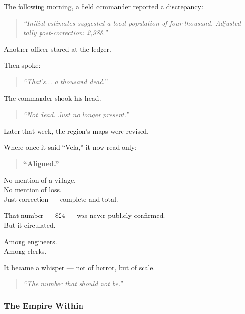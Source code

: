 \documentclass[12pt]{article}
\begin{document}
\vspace{1em}

The following morning, a field commander reported a discrepancy:

\begin{quote}
\textit{“Initial estimates suggested a local population of four thousand. Adjusted tally post-correction: 2,988.”}
\end{quote}

Another officer stared at the ledger.

Then spoke:

\begin{quote}
\textit{“That’s... a thousand dead.”}
\end{quote}

The commander shook his head.

\begin{quote}
\textit{“Not dead. Just no longer present.”}
\end{quote}

\vspace{1em}

Later that week, the region’s maps were revised.

Where once it said “Vela,” it now read only:

\begin{quote}
\textbf{“Aligned.”}
\end{quote}

No mention of a village.\\
No mention of loss.\\
Just correction — complete and total.

\vspace{1em}

That number — 824 — was never publicly confirmed.\\
But it circulated.

Among engineers.\\
Among clerks.

It became a whisper — not of horror, but of scale.

\begin{quote}
\textit{“The number that should not be.”}
\end{quote}

\dotfill

\subsubsection*{The Empire Within}
\end{document}
